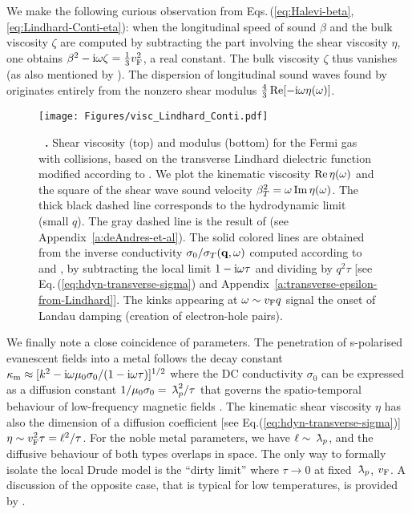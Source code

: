 \documentclass[11pt, oneside]{article}   	%
\newcommand{\lambdabar}{{\mkern+04mu\mathchar'26\mkern-09mu\lambda}}
\newcommand{\bulk}[1]{_{\mathrm{#1}}}
\renewcommand{\caption}[2][]{\refstepcounter{figure}%
\vspace*{1ex}\hspace*{8.5ex}%
\parbox{0.8\textwidth}{\small
\textbf{\figurename~\arabic{figure}.} #2}}
\begin{document}
We make the following curious observation from Eqs.\,(\ref{eq:Halevi-beta},
\ref{eq:Lindhard-Conti-eta}): when the longitudinal speed of sound $\beta$ and the bulk
viscosity $\zeta$ are computed by subtracting the part involving the shear viscosity $\eta$,
one obtains $\beta^2 - {\rm i} \omega \zeta = \frac13 v_{\rm F}^2$, a real constant.
The bulk viscosity $\zeta$ thus vanishes (as also mentioned by \citet{Conti_1999}).
The dispersion of longitudinal sound waves found by \citet{Halevi_1995} 
originates entirely from the nonzero shear modulus $\tfrac43 \mathop{\rm Re}[-{\rm i}\omega \eta(\omega)]$.

\begin{figure}[tbh]
\centerline{\texttt{[image: Figures/visc\_Lindhard\_Conti.pdf]}}
\caption[]{Shear viscosity (top) and modulus (bottom) for the Fermi gas with collisions,
based on the transverse Lindhard dielectric function modified according to \citet{Conti_1999}.
We plot the kinematic viscosity $\mathop{\rm Re}\eta(\omega)$ and the square of
the shear wave sound velocity $\beta_{T}^2 = \omega\mathop{\rm Im}\eta(\omega)$.
The thick black dashed line corresponds to the hydrodynamic
limit (small $q$). The gray dashed line is the result of \citet{deAndres_1986}
(see Appendix~\ref{a:deAndres-et-al}). 
The solid colored lines are obtained 
from the inverse conductivity $\sigma_0/\sigma_{T}({\bf q}, \omega)$ computed 
according to \citet{Kliewer_1969a} and \citet{Conti_1999}, by subtracting the local limit 
$1 - {\rm i}\omega \tau$ and dividing by $q^2\tau$
[see Eq.\,(\ref{eq:hdyn-transverse-sigma})
and Appendix~\ref{a:transverse-epsilon-from-Lindhard}].
The kinks appearing at $\omega \sim v_{\rm F} q$ signal the onset of Landau damping
(creation of electron-hole pairs).}
\label{fig:shear-viscosity}
\end{figure}

We finally note a close coincidence of parameters. The penetration of s-polarised evanescent 
fields into a metal follows the decay constant
$\kappa\bulk{m} \approx [k^2 - {\rm i} \omega \mu_0 \sigma_0/(1-{\rm i}\omega\tau)]^{1/2}$ 
where the DC conductivity $\sigma_0$ can be expressed 
as a diffusion constant $1/\mu_0\sigma_0 = \lambdabar_p^2 / \tau$ that governs the
spatio-temporal behaviour of low-frequency magnetic fields \citep{jackson2014klassische}.
The kinematic shear viscosity $\eta$ has also the dimension of a diffusion coefficient
[see Eq.(\ref{eq:hdyn-transverse-sigma})] $\eta \sim v_{\rm F}^2 \tau = \ell^2 / \tau$.
For the noble metal parameters, we have $\ell \sim \lambdabar_p$, and the diffusive behaviour
of both types overlaps in space.
The only way to formally isolate the local Drude model is the ``dirty limit'' 
where $\tau \to 0$ at fixed $\lambdabar_p$, $v_{\rm F}$. A discussion of the opposite
case, that is typical for low temperatures, is provided by 
\citet{Intravaia_2010c, Reiche_2020a}.
\end{document}
